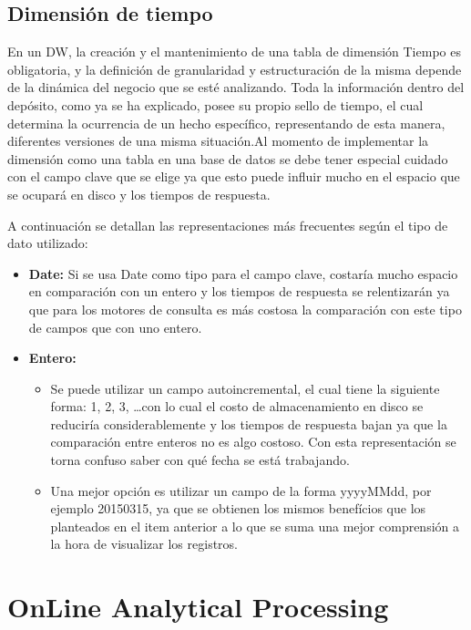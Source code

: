 \documentclass[a4paper,11pt]{article}
\begin{document}
    
    \subsection{Dimensión de tiempo}
    
    En un DW, la creación y el mantenimiento de una tabla de dimensión Tiempo es obligatoria, y la definición de granularidad y estructuración de la misma 
    depende de la dinámica del negocio que se esté analizando. Toda la información dentro del depósito, como ya se ha explicado, posee su propio sello de 
    tiempo, el cual determina la ocurrencia de un hecho específico, representando de esta manera, diferentes versiones de una misma situación.Al momento de 
    implementar la dimensión como una tabla en una base de datos se debe tener especial cuidado con el campo clave que se elige ya que esto puede influir 
    mucho en el espacio que se ocupará en disco y los tiempos de respuesta.\par
    
    A continuación se detallan las representaciones más frecuentes según el tipo de dato utilizado:
    
    \begin{itemize}
      \item \textbf{Date:} Si se usa Date como tipo para  el campo clave, costaría mucho espacio en comparación con un entero y los tiempos de respuesta se
      relentizarán ya que para los motores de consulta es más costosa la comparación con este tipo de campos que con uno entero.
      \item \textbf{Entero:}
      \begin{itemize}
        \item Se puede utilizar un campo autoincremental, el cual tiene la siguiente forma: 1, 2, 3, \dots con lo cual el costo de almacenamiento en disco
        se reduciría considerablemente y los tiempos de respuesta bajan ya que la comparación entre enteros no es algo costoso. Con esta representación se
        torna confuso saber con qué fecha se está trabajando.
        \item Una mejor opción es utilizar un campo de la forma yyyyMMdd, por ejemplo 20150315, ya que se obtienen los mismos benefícios que los planteados
        en el item anterior a lo que se suma una mejor comprensión a la hora de visualizar los registros.
      \end{itemize}
    \end{itemize}
    
    
    \section{OnLine Analytical Processing}
    
\end{document}
